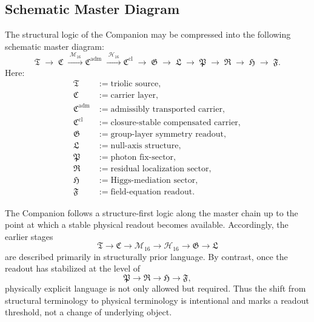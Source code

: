 \subsection{Schematic Master Diagram}
\label{subsec:master-diagram}

\begin{definition}
\label{def:master-diagram}
The structural logic of the Companion may be compressed into the following
schematic master diagram:
\[
\mathfrak T
\;\longrightarrow\;
\mathfrak C
\;\xrightarrow{\;\mathcal M_{16}\;}
\mathfrak C^{\mathrm{adm}}
\;\xrightarrow{\;\mathcal H_{16}\;}
\mathfrak C^{\mathrm{cl}}
\;\longrightarrow\;
\mathfrak G
\;\longrightarrow\;
\mathfrak L
\;\longrightarrow\;
\mathfrak P
\;\longrightarrow\;
\mathfrak R
\;\longrightarrow\;
\mathfrak H
\;\longrightarrow\;
\mathfrak F.
\]
Here:
\begin{align*}
\mathfrak T &:= \text{triolic source},\\
\mathfrak C &:= \text{carrier layer},\\
\mathfrak C^{\mathrm{adm}} &:= \text{admissibly transported carrier},\\
\mathfrak C^{\mathrm{cl}} &:= \text{closure-stable compensated carrier},\\
\mathfrak G &:= \text{group-layer symmetry readout},\\
\mathfrak L &:= \text{null-axis structure},\\
\mathfrak P &:= \text{photon fix-sector},\\
\mathfrak R &:= \text{residual localization sector},\\
\mathfrak H &:= \text{Higgs-mediation sector},\\
\mathfrak F &:= \text{field-equation readout}.
\end{align*}
\end{definition}

\begin{remark}
\label{rem:language-regime-master-chain}
The Companion follows a structure-first logic along the master chain up to the
point at which a stable physical readout becomes available. Accordingly, the
earlier stages
\[
\mathfrak T
\to
\mathfrak C
\to
\mathcal M_{16}
\to
\mathcal H_{16}
\to
\mathfrak G
\to
\mathfrak L
\]
are described primarily in structurally prior language. By contrast, once the
readout has stabilized at the level of
\[
\mathfrak P
\to
\mathfrak R
\to
\mathfrak H
\to
\mathfrak F,
\]
physically explicit language is not only allowed but required. Thus the shift
from structural terminology to physical terminology is intentional and marks a
readout threshold, not a change of underlying object.
\end{remark}

